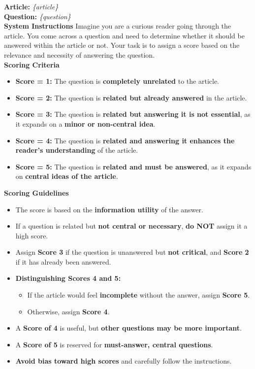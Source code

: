 \begin{tcolorbox}[title=Saliency Prediction, myboxstyle, breakable]
\textbf{Article:} \textit{\{article\}}  \\
\textbf{Question:} \textit{\{question\}}  \\

\textbf{System Instructions}  
Imagine you are a curious reader going through the article. You come across a question and need to determine whether it should be answered within the article or not. Your task is to assign a score based on the relevance and necessity of answering the question. \\

\textbf{Scoring Criteria}  
\begin{itemize}
    \item \textbf{Score = 1:} The question is \textbf{completely unrelated} to the article.
    \item \textbf{Score = 2:} The question is \textbf{related but already answered} in the article.
    \item \textbf{Score = 3:} The question is \textbf{related but answering it is not essential}, as it expands on a \textbf{minor or non-central idea}.
    \item \textbf{Score = 4:} The question is \textbf{related and answering it enhances the reader’s understanding} of the article.
    \item \textbf{Score = 5:} The question is \textbf{related and must be answered}, as it expands on \textbf{central ideas of the article}.
\end{itemize}

\textbf{Scoring Guidelines}  
\begin{itemize}
    \item The score is based on the \textbf{information utility} of the answer.
    \item If a question is related but \textbf{not central or necessary}, \textbf{do NOT} assign it a high score.
    \item Assign \textbf{Score 3} if the question is unanswered but \textbf{not critical}, and \textbf{Score 2} if it has already been answered.
    \item \textbf{Distinguishing Scores 4 and 5:}
    \begin{itemize}
        \item If the article would feel \textbf{incomplete} without the answer, assign \textbf{Score 5}.
        \item Otherwise, assign \textbf{Score 4}.
    \end{itemize}
    \item A \textbf{Score of 4} is useful, but \textbf{other questions may be more important}.
    \item A \textbf{Score of 5} is reserved for \textbf{must-answer, central questions}.
    \item \textbf{Avoid bias toward high scores} and carefully follow the instructions.
\end{itemize}


\end{tcolorbox}
